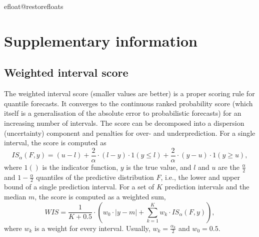 \documentclass[10pt,a4paper,twocolumn]{article}
\begin{document}
\clearpage

{\small
}

\bigskip
\clearpage


\csname efloat@restorefloats\endcsname

\appendix
\section*{Supplementary information}
\renewcommand{\thefigure}{SI.\arabic{figure}}
\setcounter{figure}{0}
\renewcommand{\thetable}{SI.\arabic{table}} \setcounter{table}{0}


\subsection*{Weighted interval score}
\label{sec:wis}

The weighted interval score (smaller values are better) is a proper scoring rule for quantile forecasts. It converges to the continuous ranked probability score (which itself is a generalisation of the absolute error to probabilistic forecasts) for an increasing number of intervals. The score can be decomposed into a dispersion (uncertainty) component and penalties for over- and underprediction. For a single interval, the score is computed as 
  $$IS_\alpha(F,y) = (u-l) + \frac{2}{\alpha} \cdot (l-y) \cdot 1(y \leq l) + \frac{2}{\alpha} \cdot (y-u) \cdot 1(y \geq u), $$ 
  where $1()$ is the indicator function, $y$ is the true value, and $l$ and $u$ are the $\frac{\alpha}{2}$ and $1 - \frac{\alpha}{2}$ quantiles of the predictive distribution $F$, i.e., the lower and upper bound of a single prediction interval. For a set of $K$ prediction intervals and the median $m$, the score is computed as a weighted sum, 
  $$WIS = \frac{1}{K + 0.5} \cdot \left( w_0 \cdot |y - m| + \sum_{k = 1}^{K} w_k \cdot IS_{\alpha}(F, y) \right), $$
  where $w_k$ is a weight for every interval. Usually, $w_k = \frac{\alpha_k}{2}$ and $w_0 = 0.5$. 


\end{document}
